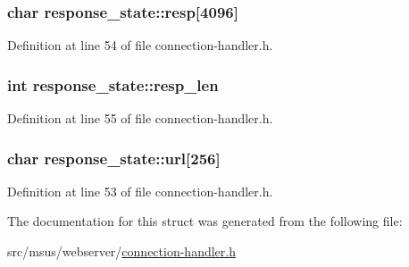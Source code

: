 \hypertarget{structresponse__state_afb106346ba6cd2fbbd890c8ec9540876}{
\subsubsection[{resp}]{\setlength{\rightskip}{0pt plus 5cm}char response\-\_\-state\-::resp\mbox{[}4096\mbox{]}}}\label{structresponse__state_afb106346ba6cd2fbbd890c8ec9540876}


Definition at line 54 of file connection-\/handler.\-h.

\hypertarget{structresponse__state_ae88a2831ab15e9936f7eff929ee907c4}{
\subsubsection[{resp\-\_\-len}]{\setlength{\rightskip}{0pt plus 5cm}int response\-\_\-state\-::resp\-\_\-len}}\label{structresponse__state_ae88a2831ab15e9936f7eff929ee907c4}


Definition at line 55 of file connection-\/handler.\-h.

\hypertarget{structresponse__state_a8f1c401abbed7387d7e60181d0cb2791}{
\subsubsection[{url}]{\setlength{\rightskip}{0pt plus 5cm}char response\-\_\-state\-::url\mbox{[}256\mbox{]}}}\label{structresponse__state_a8f1c401abbed7387d7e60181d0cb2791}


Definition at line 53 of file connection-\/handler.\-h.



The documentation for this struct was generated from the following file\-:\begin{DoxyCompactItemize}
\item 
src/msus/webserver/\hyperlink{connection-handler_8h}{connection-\/handler.\-h}\end{DoxyCompactItemize}
